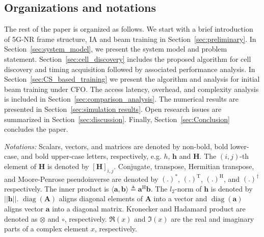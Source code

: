 \documentclass[journal]{IEEEtran}
\DeclareMathOperator{\diag}{\mathrm{diag}}
\newcommand{\hermitian}[0]{\text{H}}
\newcommand{\transpose}[0]{\text{T}}
\begin{document}


\subsection{Organizations and notations}
The rest of the paper is organized as follows. We start with a brief introduction of 5G-NR frame structure, IA and beam training in Section~\ref{sec:preliminary}. In Section~\ref{sec:system_model}, we present the system model and problem statement. Section~\ref{sec:cell_discovery} includes the proposed algorithm for cell discovery and timing acquisition followed by associated performance analysis. In Section~\ref{sec:CS_based_training} we present the algorithm and analysis for initial beam training under CFO. The access latency, overhead, and complexity analysis is included in Section~\ref{sec:comparison_analysis}. The numerical results are presented in Section~\ref{sec:simulation results}. Open research issues are summarized in Section~\ref{sec:discussion}. Finally, Section~\ref{sec:Conclusion} concludes the paper.


\textit{Notations:} Scalars, vectors, and matrices are denoted by non-bold, bold lower-case, and bold upper-case letters, respectively, e.g. $h$, $\mathbf{h}$ and $\mathbf{H}$. The $(i,j)$-th element of $\mathbf{H}$ is denoted by $[\mathbf{H}]_{i,j}$. Conjugate, transpose, Hermitian transpose, and Moore-Penrose pseudoinverse are denoted by $(.)^{*}$, $(.)^{\transpose}$, $(.)^{\hermitian}$, and $(.)^{\dagger}$ respectively. The inner product is $\langle \mathbf{a},\mathbf{b}\rangle  \triangleq  \mathbf{a}^{\hermitian}\mathbf{b}$. The $l_2$-norm of $\mathbf{h}$ is denoted by $||\mathbf{h}||$. $\diag(\mathbf{A})$ aligns diagonal elements of $\mathbf{A}$ into a vector and $\diag(\mathbf{a})$ aligns vector $\mathbf{a}$ into a diagonal matrix. Kronecker and Hadamard product are denoted as $\otimes$ and $\circ$, respectively. $\Re(x)$ and $\Im(x)$ are the real and imaginary parts of a complex element $x$, respectively.

\end{document}

